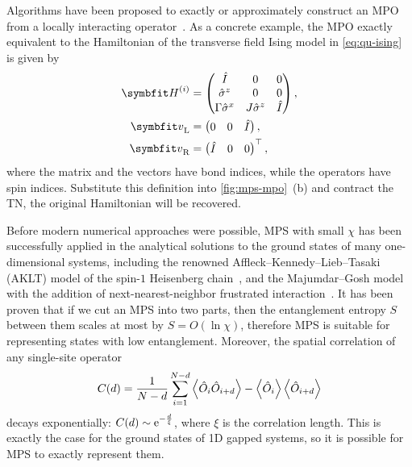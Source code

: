 Algorithms have been proposed to exactly or approximately construct an MPO from a locally interacting operator~\cite{crosswhite2008finite, hubig2017generic, paeckel2017automated}. As a concrete example, the MPO exactly equivalent to the Hamiltonian of the transverse field Ising model in \cref{eq:qu-ising} is given by
\begin{align}
\mH^{(i)} &= \begin{pmatrix}
\hat{I} & 0 & 0 \\
\hat{\sigma}^z & 0 & 0 \\
\Gamma \hat{\sigma}^x & J \hat{\sigma}^z & \hat{I}
\end{pmatrix}, \\
\vv_\text{L} &= \begin{pmatrix} 0 & 0 & \hat{I} \end{pmatrix}, \\
\vv_\text{R} &= \begin{pmatrix} \hat{I} & 0 & 0 \end{pmatrix}^\transpose,
\end{align}
where the matrix and the vectors have bond indices, while the operators have spin indices. Substitute this definition into \cref{fig:mps-mpo}~(b) and contract the TN, the original Hamiltonian will be recovered.

Before modern numerical approaches were possible, MPS with small $\chi$ has been successfully applied in the analytical solutions to the ground states of many one-dimensional systems, including the renowned Affleck--Kennedy--Lieb--Tasaki (AKLT) model of the spin-$1$ Heisenberg chain~\cite{affleck1987rigorous, klumper1991equivalence, fannes1992finitely}, and the Majumdar--Gosh model with the addition of next-nearest-neighbor frustrated interaction~\cite{majumdar1969next}. It has been proven that if we cut an MPS into two parts, then the entanglement entropy $S$ between them scales at most by $S = O(\ln \chi)$, therefore MPS is suitable for representing states with low entanglement\cite{verstraete2008matrix}. Moreover, the spatial correlation of any single-site operator
\begin{equation}
C(d) = \frac{1}{N - d} \sum_{i = 1}^{N - d} \ev{\hat{O}_i \hat{O}_{i + d}} - \ev{\hat{O}_i} \ev{\hat{O}_{i + d}}
\end{equation}
decays exponentially: $C(d) \sim \mathrm{e}^{-\frac{d}{\xi}}$, where $\xi$ is the correlation length. This is exactly the case for the ground states of 1D gapped systems, so it is possible for MPS to exactly represent them.

